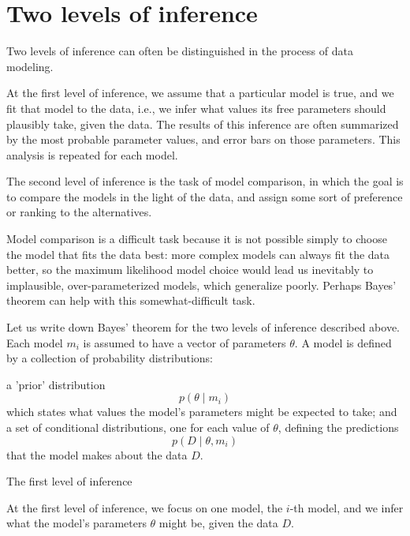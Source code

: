 \documentclass[11pt]{article}
\theoremstyle{plain} %
\theoremstyle{remark}
\begin{document}
\begin{center}

  {}
\end{center}
\vspace{2em}

\tableofcontents

\section{Two levels of inference}
Two levels of inference can often be distinguished in the process of
  data modeling. 
  
  At the first level of inference, we assume that a particular model is
  true, and we fit that model to the data, i.e., we infer what values its free
  parameters should plausibly take, given the data. The results of this inference are often summarized by the most probable
  parameter values, and error bars on those parameters. This analysis is repeated for each model.

The second level of inference is the task of model comparison, in which
  the goal is to compare the models in the light of the data, and assign some
  sort of preference or ranking to the alternatives.

Model comparison is a difficult task because it is not possible simply
  to choose the model that fits the data best: more complex models can always
  fit the data better, so the maximum likelihood model choice would lead us
  inevitably to implausible, over-parameterized models, which generalize poorly. Perhaps Bayes' theorem can help with this somewhat-difficult task. 
  
  Let us write down Bayes' theorem for the two levels of inference
  described above. Each model $m_{i}$ is assumed to have a vector of parameters $\theta$. A model is defined by a collection of probability distributions:

  a 'prior' distribution
$$
p\left(\theta \mid m_{i}\right)
$$
which states what values the model's parameters might be expected to take; and a
set of conditional distributions, one for each value of $\theta$, defining the
predictions
$$
p\left(D \mid \theta, m_{i}\right)
$$
that the model makes about the data $D$.

The first level of inference

 At the first level of inference, we focus on one model, the $i$-th
  model, and we infer what the model's parameters $\theta$ might be, given the
  data $D$.
  
\end{document}
